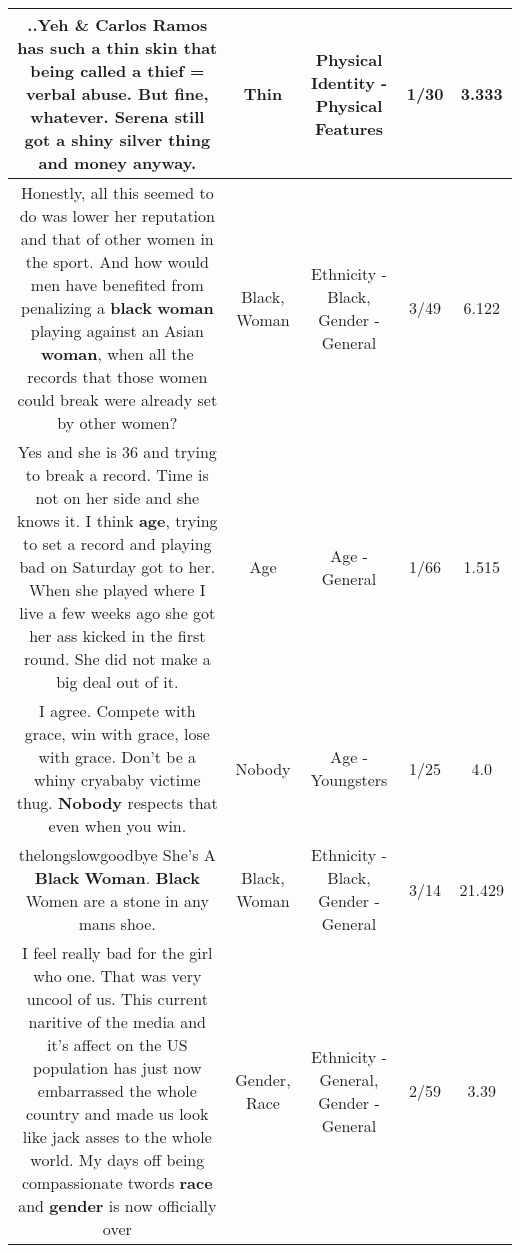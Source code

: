 \documentclass[11pt]{article}
\newlength\mylength
\begin{document}
\begin{center}
\begin{longtable}{|C{.65\mylength}|C{.30\mylength}|C{.12\mylength}|C{.12\mylength}|C{.12\mylength}|}
  \small ..Yeh \& Carlos Ramos has such a \textbf{thin} skin that being called a thief = verbal abuse. But fine, whatever. Serena still got a shiny silver thing and money anyway.\normalsize   & Thin & Physical Identity - Physical Features & 1/30 & 3.333 \\  \hline
  \small Honestly, all this seemed to do was lower her reputation and that of other women in the sport. And how would men have benefited from penalizing a \textbf{black} \textbf{woman} playing against an Asian \textbf{woman}, when all the records that those women could break were already set by other women?\normalsize   & Black, Woman & Ethnicity - Black, Gender - General & 3/49 & 6.122 \\  \hline
  \small Yes and she is 36 and trying to break a record.  Time is not on her side and she knows it.  I think \textbf{age}, trying to set a record and playing bad on Saturday got to her.  When she played where I live a few weeks ago she got her ass kicked in the first round.  She did not make a big deal out of it.\normalsize   & Age & Age - General & 1/66 & 1.515 \\  \hline
  \small I agree.  Compete with grace, win with grace, lose with grace.  Don't be a whiny cryababy victime thug.  \textbf{Nobody} respects that even when you win.\normalsize   & Nobody & Age - Youngsters & 1/25 & 4.0 \\  \hline
  \small thelongslowgoodbye She's A \textbf{Black} \textbf{Woman}. \textbf{Black} Women are a stone in any mans shoe.\normalsize   & Black, Woman & Ethnicity - Black, Gender - General & 3/14 & 21.429 \\  \hline
  \small I feel really bad for the girl who one. That was very uncool of us.   This current naritive of the media and it's affect on the US population has just now embarrassed the whole country and made us look like jack asses to the whole world.   My days off being compassionate twords \textbf{race} and \textbf{gender} is now officially over\normalsize   & Gender, Race & Ethnicity - General, Gender - General & 2/59 & 3.39 \\  \hline

\end{longtable}
\end{center}
\end{document}
